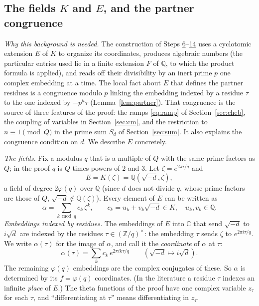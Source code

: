 \documentclass[11pt]{amsart}
\numberwithin{equation}{section}
\theoremstyle{definition}
\theoremstyle{remark}
\newcommand{\Z}{\mathbb Z}
\newcommand{\Q}{\mathbb Q}
\newcommand{\C}{\mathbb C}
\begin{document}
\subsection*{The fields $K$ and $E$, and the partner congruence}
\emph{Why this background is needed.} The construction of Steps \hyperref[step:6]{6}--\hyperref[step:14]{14} uses a cyclotomic extension $E$ of $K$ to organize its coordinates, produces algebraic numbers (the particular entries used lie in a finite extension $F$ of $\Q$, to which the product formula is applied), and reads off their divisibility by an inert prime $p$ one complex embedding at a time. The local fact about $E$ that defines the partner residues is a congruence modulo $p$ linking the embedding indexed by a residue $\tau$ to the one indexed by $-p^h\tau$ (Lemma~\ref{lem:partner}). That congruence is the source of three features of the proof: the ramps \eqref{eq:ramp} of Section~\ref{sec:cheb}, the coupling of variables in Section~\ref{sec:cm}, and the restriction to $n\equiv1\pmod Q$ in the prime sum $S_d$ of Section~\ref{sec:sum}. It also explains the congruence condition on $d$. We describe $E$ concretely.

\emph{The fields.} Fix a modulus $q$ that is a multiple of $Q$ with the same prime factors as $Q$; in the proof $q$ is $Q$ times powers of $2$ and $3$. Let $\zeta=e^{2\pi i/q}$ and
\begin{equation}
 E=K(\zeta)=\Q(\sqrt{-d},\zeta),
\end{equation}
a field of degree $2\varphi(q)$ over $\Q$ (since $d$ does not divide $q$, whose prime factors are those of $Q$, $\sqrt{-d}\notin\Q(\zeta)$). Every element of $E$ can be written as
\begin{equation}\label{eq:alpha}
 \alpha=\sum_{k\bmod q}c_k\,\zeta^k,\qquad c_k=u_k+v_k\sqrt{-d}\in K,\quad u_k,v_k\in\Q .
\end{equation}
\emph{Embeddings indexed by residues.} The embeddings of $E$ into $\C$ that send $\sqrt{-d}$ to $i\sqrt d$ are indexed by the residues $\tau\in(\Z/q)^\times$: the embedding $\tau$ sends $\zeta$ to $e^{2\pi i\tau/q}$. We write $\alpha(\tau)$ for the image of $\alpha$, and call it the \emph{coordinate} of $\alpha$ at $\tau$:
\begin{equation}
 \alpha(\tau)=\sum_kc_k\,e^{2\pi ik\tau/q}\qquad(\sqrt{-d}\mapsto i\sqrt d).
\end{equation}
The remaining $\varphi(q)$ embeddings are the complex conjugates of these. So $\alpha$ is determined by its $f=\varphi(q)$ coordinates. (In the literature a residue $\tau$ indexes an infinite \emph{place} of $E$.) The theta functions of the proof have one complex variable $z_\tau$ for each $\tau$, and ``differentiating at $\tau$'' means differentiating in $z_\tau$.
\end{document}
